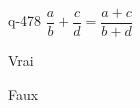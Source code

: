 \begin{truefalse}{q-478}
$\dfrac{a}{b}+ \dfrac{c}{d} =\dfrac{a+c}{b+d}$
\item Vrai
\item* Faux
\end{truefalse}

